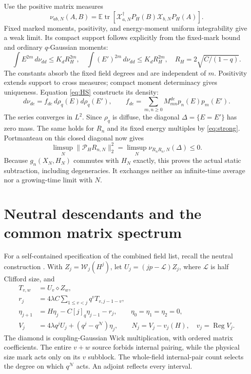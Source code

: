 \documentclass[11pt]{article}
\newcommand{\EE}{\mathbb E}
\newcommand{\tr}{\operatorname{tr}}
\newcommand{\NN}{\mathcal N}
\newcommand{\WW}{\mathcal W}
\newcommand{\LL}{\mathcal L}
\newcommand{\PP}{\mathcal P_H}
\newcommand{\Reg}{\operatorname{Reg}}
\begin{document}
Use the positive matrix measures
\begin{equation}
 \nu_{ab,N}(A,B)=\EE\tr[\mathcal X_{a,N}^\dagger
 P_H(B)\mathcal X_{b,N}P_H(A)].\label{eq:nu}
\end{equation}
Fixed marked moments, positivity, and energy-moment uniform
integrability give a weak limit. Its compact support follows explicitly
from the fixed-mark bound and ordinary $q$-Gaussian moments:
\begin{equation}
 \int E^{2m}\,d\nu_{dd}\le K_dR_H^{2m},\quad
 \int (E')^{2m}\,d\nu_{dd}\le K_dR_H^{2m},\quad
 R_H=2\sqrt{C/(1-q)}.
\end{equation}
The constants absorb the fixed field degrees and are independent of
$m$. Positivity extends support to cross measures; compact moment
determinacy gives uniqueness. Equation \eqref{eq:HS} constructs its density:
\begin{equation}
 d\nu_{de}=f_{de}\,d\rho_q(E)d\rho_q(E'),\qquad
 f_{de}=\sum_{m,n\ge0}M_{mn}^{de}p_n(E)p_m(E').\label{eq:density}
\end{equation}
The series converges in $L^2$. Since $\rho_q$ is diffuse, the diagonal
$\Delta=\{E=E'\}$ has zero mass. The same holds for $R_n$ and its
fixed energy multiples by \eqref{eq:strong}. Portmanteau on this
closed diagonal now gives
\begin{equation}
 \limsup_N\|\PP R_{n,N}\|_2^2
 =\limsup_N\nu_{R_nR_n,N}(\Delta)\le0.\label{eq:pinch}
\end{equation}
Because $g_n(X_N,H_N)$ commutes with $H_N$ exactly, this proves the
actual static subtraction, including degeneracies. It exchanges
neither an infinite-time average nor a growing-time limit with $N$.

\newpage
\section{Neutral descendants and the common matrix spectrum}
For a self-contained specification of the combined field list, recall
the neutral construction \cite{Neutral}. With $Z_j=\WW_j(H^j)$,
let $U_j=(jp-\LL)Z_j$, where $\LL$ is half Clifford size, and
\begin{align}
 T_{v,w}&=U_v\diamond Z_w,\\
 r_j&=4\lambda C\sum_{1\le v<j}q^vT_{v,j-1-v},\\
 \eta_{j+1}&=H\eta_j-C[j]_q\eta_{j-1}-r_j,
 \qquad \eta_0=\eta_1=\eta_2=0,\\
 V_j&=4\lambda q^jU_j+(q^j-q^{\NN})\eta_j,\qquad
 N_j=V_j-v_j(H),\quad v_j=\Reg V_j.
\end{align}
The diamond is coupling-Gaussian Wick multiplication, with ordered
matrix coefficients. The entire $v+w$ source forbids internal
pairing, while the physical size mark acts only on its $v$ subblock.
The whole-field internal-pair count selects the degree on which
$q^{\NN}$ acts. An adjoint reflects every interval.
\end{document}

